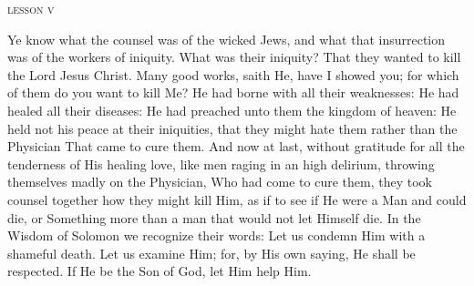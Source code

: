 \bigskip\bigskip
\pagebreak
{}
\begin{center}{\textsc{lesson v}}\end{center}

{
{Ye know what the counsel was of the wicked Jews, and what that insurrection was of the workers of iniquity. What was their iniquity? That they wanted to kill the Lord Jesus Christ. Many good works, saith He, have I showed you; for which of them do you want to kill Me? He had borne with all their weaknesses: He had healed all their diseases: He had preached unto them the kingdom of heaven: He held not his peace at their iniquities, that they might hate them rather than the Physician That came to cure them. And now at last, without gratitude for all the tenderness of His healing love, like men raging in an high delirium, throwing themselves madly on the Physician, Who had come to cure them, they took counsel together how they might kill Him, as if to see if He were a Man and could die, or Something more than a man that would not let Himself die. In the Wisdom of Solomon we recognize their words: Let us condemn Him with a shameful death. Let us examine Him; for, by His own saying, He shall be respected. If He be the Son of God, let Him help Him.}
}%

\bigskip\bigskip
\pagebreak

{\myrespsize
\label{resp5_tenebrae}
}

